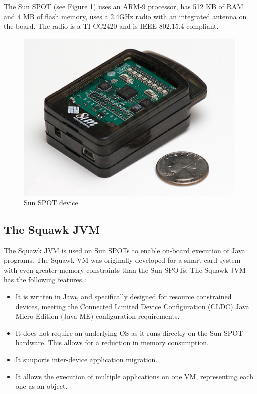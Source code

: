 The Sun SPOT (see Figure \ref{Fig:SunSpot}) uses an ARM-9 processor, has 512 KB of RAM
and 4 MB of flash memory, uses a 2.4GHz radio with an integrated antenna on the board. The radio
is a TI CC2420 and is IEEE 802.15.4 compliant.

\begin{figure} 
\centering
\includegraphics[scale=0.50]{img/sunspot1.eps} 
\caption[Sun SPOT device]{Sun SPOT device}
\label{Fig:SunSpot}
\end{figure} 


\subsection{The Squawk JVM}

The Squawk JVM is used on Sun SPOTs to enable on-board execution of Java
programs. The Squawk VM was originally developed for a smart card system with
even greater memory constraints than the Sun SPOTs. The Squawk JVM has the
following features \cite{simon_squawk:2006}:

\begin{itemize}
  \item It is written in Java, and specifically designed for resource
  constrained devices, meeting the Connected Limited Device Configuration
  (CLDC) Java Micro Edition (Java ME) configuration requirements.
  \item It does not require an underlying OS as it runs directly on the Sun
  SPOT hardware. This allows for a reduction in memory consumption.
  \item It suuports inter-device application migration.
  \item It allows the execution of multiple applications on one VM,
  representing each one as an object.
\end{itemize}


